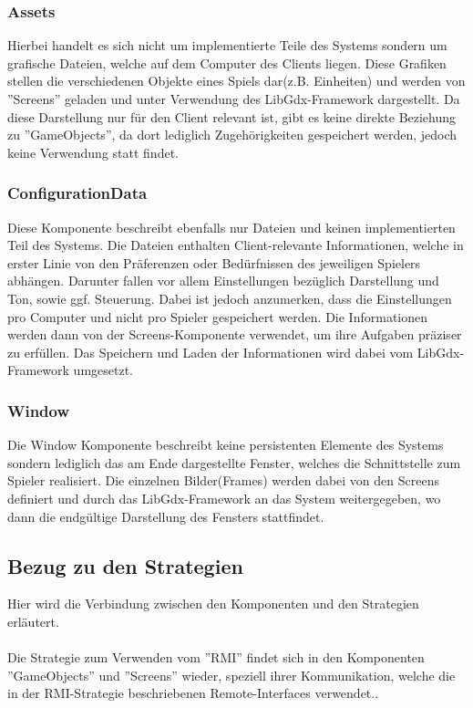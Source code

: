 \documentclass[fontsize=12pt,paper=a4,twoside]{scrartcl}
\begin{document}
\subsubsection{Assets}
Hierbei handelt es sich nicht um implementierte Teile des Systems sondern um grafische Dateien, welche auf dem Computer des Clients liegen. Diese Grafiken stellen die verschiedenen Objekte eines Spiels dar(z.B. Einheiten) und werden von ''Screens'' geladen und unter Verwendung des LibGdx-Framework dargestellt. Da diese Darstellung nur für den Client relevant ist, gibt es keine direkte Beziehung zu ''GameObjects'', da dort lediglich Zugehörigkeiten gespeichert werden, jedoch keine Verwendung statt findet.

\subsubsection{ConfigurationData}
Diese Komponente beschreibt ebenfalls nur Dateien und keinen implementierten Teil des Systems. Die Dateien enthalten Client-relevante Informationen, welche in erster Linie von den Präferenzen oder Bedürfnissen des jeweiligen Spielers abhängen. Darunter fallen vor allem Einstellungen bezüglich Darstellung und Ton, sowie ggf. Steuerung. Dabei ist jedoch anzumerken, dass die Einstellungen pro Computer und nicht pro Spieler gespeichert werden. Die Informationen werden dann von der Screens-Komponente verwendet, um ihre Aufgaben präziser zu erfüllen. Das Speichern und Laden der Informationen wird dabei vom LibGdx-Framework umgesetzt.

\subsubsection{Window}

Die Window Komponente beschreibt keine persistenten Elemente des Systems sondern lediglich das am Ende dargestellte Fenster, welches die Schnittstelle zum Spieler realisiert. Die einzelnen Bilder(Frames) werden dabei von den Screens definiert und durch das LibGdx-Framework an das System  weitergegeben, wo dann die endgültige Darstellung des Fensters stattfindet.

\subsection{Bezug zu den Strategien}
Hier wird die Verbindung zwischen den Komponenten und den Strategien erläutert.\\\\
Die Strategie zum Verwenden vom ''RMI'' findet sich in den Komponenten ''GameObjects'' und ''Screens'' wieder, speziell ihrer Kommunikation, welche die in der RMI-Strategie beschriebenen Remote-Interfaces verwendet.. \\
\end{document}

